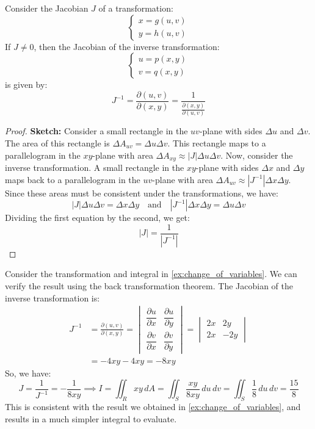 \documentclass[11pt]{report}
\begin{document}
\begin{theorem}
    Consider the Jacobian $J$ of a transformation:
    $$
    \begin{cases}
        x = g(u,v) \\
        y = h(u,v)
    \end{cases}
    $$
    If $J \neq 0$, then the Jacobian of the inverse transformation:
    $$
    \begin{cases}
        u = p(x,y) \\
        v = q(x,y)
    \end{cases}
    $$
    is given by:
    \begin{equation}
        J^{-1} = \frac{\partial(u,v)}{\partial(x,y)} = \frac{1}{\frac{\partial(x,y)}{\partial(u,v)}}
    \end{equation}
\end{theorem}
\begin{proof}
    \textbf{Sketch:} Consider a small rectangle in the $uv$-plane with sides $\Delta u$ and $\Delta v$. The area of this rectangle is $\Delta A_{uv} = \Delta u \Delta v$. This rectangle maps to a parallelogram in the $xy$-plane with area $\Delta A_{xy} \approx |J| \Delta u \Delta v$. Now, consider the inverse transformation. A small rectangle in the $xy$-plane with sides $\Delta x$ and $\Delta y$ maps back to a parallelogram in the $uv$-plane with area $\Delta A_{uv} \approx |J^{-1}| \Delta x \Delta y$. Since these areas must be consistent under the transformations, we have:
    $$
        |J| \Delta u \Delta v = \Delta x \Delta y \quad \text{and} \quad |J^{-1}| \Delta x \Delta y = \Delta u \Delta v
    $$
    Dividing the first equation by the second, we get:
    $$
        |J| = \frac{1}{|J^{-1}|}
    $$
\end{proof}

\begin{example}
    Consider the transformation and integral in \ref{ex:change_of_variables}. We can verify the result using the back transformation theorem. The Jacobian of the inverse transformation is:
    \begin{align*}
        J^{-1} &= \frac{\partial(u,v)}{\partial(x,y)} = \begin{vmatrix}
            \dfrac{\partial u}{\partial x} & \dfrac{\partial u}{\partial y} \\
            \dfrac{\partial v}{\partial x} & \dfrac{\partial v}{\partial y}
        \end{vmatrix} = \begin{vmatrix}
            2x & 2y \\
            2x & -2y
        \end{vmatrix} \\
        &= -4xy - 4xy = -8xy
    \end{align*}
    So, we have:
    $$        
        J = \frac{1}{J^{-1}} = -\frac{1}{8xy} \implies I = \iint_R xy \, dA = \iint_S \frac{xy}{8xy} \, du \, dv = \iint_S \frac{1}{8} \, du \, dv = \frac{15}{8}
    $$
    This is consistent with the result we obtained in \ref{ex:change_of_variables}, and results in a much simpler integral to evaluate.
\end{example}
\end{document}
